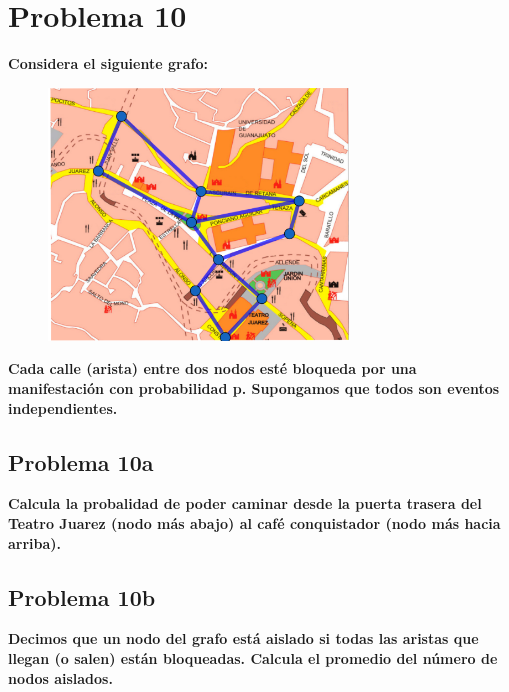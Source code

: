 \section*{Problema 10}
\textbf{Considera el siguiente grafo:}
\begin{figure}[H]
    \centering
    \includegraphics[width=8cm]{Graphics/problema_10.png}
\end{figure}
\textbf{Cada calle (arista) entre dos nodos esté bloqueda por una manifestación con probabilidad p. Supongamos que todos son eventos independientes.}
\subsection*{Problema 10a}
\textbf{Calcula la probalidad de poder caminar desde la puerta trasera del Teatro Juarez (nodo más abajo) al café conquistador (nodo más hacia arriba).}
\subsection*{Problema 10b}
\textbf{Decimos que un nodo del grafo está aislado si todas las aristas que llegan (o salen) están bloqueadas. Calcula el promedio del número de nodos aislados.}